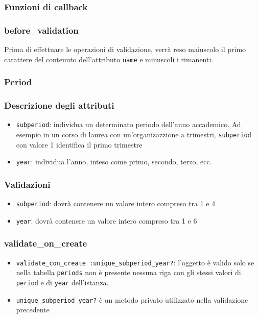 \documentclass[11pt,a4paper]{article}
\begin{document}
\subsubsection*{Funzioni di callback}
\subsubsection*{before\_validation}
Prima di effettuare le operazioni di validazione, verrà reso maiuscolo il primo carattere del contenuto dell'attributo \verb|name| e minuscoli i rimanenti.
\subsubsection{Period}
\subsubsection*{Descrizione degli attributi}
\begin{itemize}
 \item \verb|subperiod|: individua un determinato periodo dell'anno accademico. Ad esempio in un corso di laurea con un'organizazzione a trimestri, \verb|subperiod| con valore 1 identifica il primo trimestre
 \item \verb|year|: individua l'anno, inteso come primo, secondo, terzo, ecc.
\end{itemize}
\subsubsection*{Validazioni}
\begin{itemize}
 \item \verb|subperiod|: dovrà contenere un valore intero compreso tra 1 e 4
\item \verb|year|: dovrà contenere un valore intero compreso tra 1 e 6
\end{itemize}
\subsubsection*{validate\_on\_create}
\begin{itemize}
 \item \verb|validate_con_create :unique_subperiod_year?|: l'oggetto è valido solo se nella tabella \verb|periods| non è presente nessuna riga con gli stessi valori di \verb|period| e di \verb|year| dell'istanza.
 \item \verb|unique_subperiod_year?| è un metodo privato utilizzato nella validazione precedente
\end{itemize}
\end{document}
